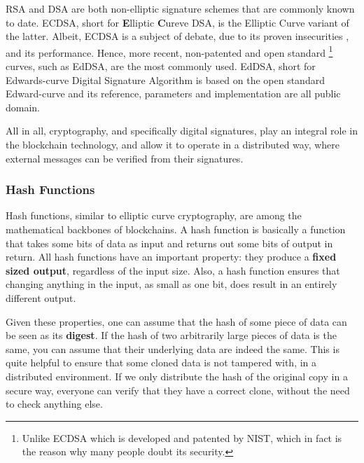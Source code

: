 RSA and DSA are both non-elliptic signature schemes that are commonly known to date. ECDSA, short
for \textbf{E}lliptic \textbf{C}ureve DSA, is the Elliptic Curve variant of the latter. Albeit,
ECDSA is a subject of debate, due to its proven insecurities
\cite{Brumley_Tuveri_2011_remote_timing_ecdsa}, and its performance. Hence, more recent,
non-patented and open standard \footnote{Unlike ECDSA which is developed and patented by NIST, which
in fact is the reason why many people doubt its security.} curves, such as EdDSA, are the most
commonly used. EdDSA, short for Edwards-curve Digital Signature Algorithm is based on the open
standard Edward-curve and its reference, parameters and implementation are all public domain.

All in all, cryptography, and specifically digital signatures, play an integral role in the
blockchain technology, and allow it to operate in a distributed way, where external messages can be
verified from their signatures.

\subsubsection{Hash Functions} \label{chap_bg:subsec:hash}

Hash functions, similar to elliptic curve cryptography, are among the mathematical backbones of
blockchains. A hash function is basically a function that takes some bits of data as input and
returns out some bits of output in return. All hash functions have an important property: they
produce a \textbf{fixed sized output}, regardless of the input size. Also, a hash function ensures
that changing anything in the input, as small as one bit, does result in an entirely different
output.

Given these properties, one can assume that the hash of some piece of data can be seen as its
\textbf{digest}. If the hash of two arbitrarily large pieces of data is the same, you can assume
that their underlying data are indeed the same. This is quite helpful to ensure that some cloned
data is not tampered with, in a distributed environment. If we only distribute the hash of the
original copy in a secure way, everyone can verify that they have a correct clone, without the need
to check anything else.

